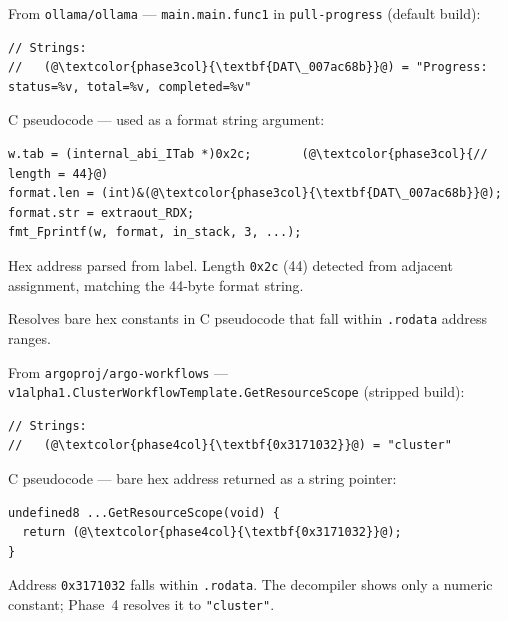 \documentclass[border=10pt]{standalone}
\newcommand{\phasegap}{\vspace{8pt}}
\begin{document}
\begin{varwidth}{16cm}
\begin{tcolorbox}
{\scriptsize\sffamily\color{labelgray} From \texttt{ollama/ollama} --- \texttt{main.main.func1} in \texttt{pull-progress} (default build):}
\vspace{2pt}
\begin{lstlisting}[style=annot]
// Strings:
//   (@\textcolor{phase3col}{\textbf{DAT\_007ac68b}}@) = "Progress: status=%v, total=%v, completed=%v"
\end{lstlisting}
\vspace{2pt}
{\scriptsize\sffamily\color{labelgray} C pseudocode --- used as a format string argument:}
\begin{lstlisting}[style=cstyle]
w.tab = (internal_abi_ITab *)0x2c;       (@\textcolor{phase3col}{// length = 44}@)
format.len = (int)&(@\textcolor{phase3col}{\textbf{DAT\_007ac68b}}@);
format.str = extraout_RDX;
fmt_Fprintf(w, format, in_stack, 3, ...);
\end{lstlisting}
{\scriptsize\sffamily\color{labelgray} Hex address parsed from label. Length \texttt{0x2c} (44) detected from adjacent assignment, matching the 44-byte format string.}
\end{tcolorbox}

\phasegap

\begin{tcolorbox}[
    title={\sffamily\bfseries Phase 4: Hex Literals},
    colframe=phase4col, colback=codebg, colbacktitle=phase4col!15!white,
    coltitle=phase4col, fonttitle=\small,
    width=16cm, boxrule=0.5pt, left=3pt, right=3pt, top=2pt, bottom=2pt,
    subtitle style={colback=phase4col!8!white, coltitle=phase4col},
]
\small\sffamily Resolves bare hex constants in C pseudocode that fall within \texttt{.rodata} address ranges.

\tcblower

{\scriptsize\sffamily\color{labelgray} From \texttt{argoproj/argo-workflows} --- \texttt{v1alpha1.ClusterWorkflowTemplate.GetResourceScope} (stripped build):}
\vspace{2pt}
\begin{lstlisting}[style=annot]
// Strings:
//   (@\textcolor{phase4col}{\textbf{0x3171032}}@) = "cluster"
\end{lstlisting}
\vspace{2pt}
{\scriptsize\sffamily\color{labelgray} C pseudocode --- bare hex address returned as a string pointer:}
\begin{lstlisting}[style=cstyle]
undefined8 ...GetResourceScope(void) {
  return (@\textcolor{phase4col}{\textbf{0x3171032}}@);
}
\end{lstlisting}
{\scriptsize\sffamily\color{labelgray} Address \texttt{0x3171032} falls within \texttt{.rodata}. The decompiler shows only a numeric constant; Phase~4 resolves it to \texttt{"cluster"}.}
\end{tcolorbox}

\end{varwidth}
\end{document}

